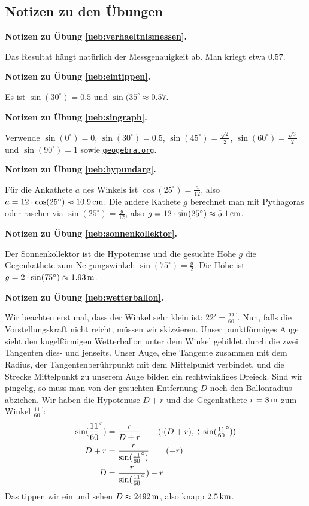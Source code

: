 \documentclass[%
11pt,%
twoside,%
titlepage,%
german,%
headsepline%
]{scrartcl}
\newcommand{\geogebralink}{\href{https://www.geogebra.org/calculator}{\texttt{geogebra.org}}}
\newcommand{\concatueb}[1]{ueb:#1}%
\newcommand{\concatlsg}[1]{lsg:#1}%
\newenvironment{lsg}[1]{%
    \par\noindent\textbf{Notizen zu Übung \ref{\concatueb{#1}}.}%
    \label{\concatlsg{#1}}
}{%
    \par%
}
\begin{document}
\clearpage

\subsection{Notizen zu den \"Ubungen}

\begin{lsg}{verhaeltnismessen}
Das Resultat h\"angt nat\"urlich der Messgenauigkeit ab. Man kriegt etwa $0.57$.
\end{lsg}

\begin{lsg}{eintippen}
Es ist $\sin(30^\circ)=0.5$ und $\sin(35^{\circ}\approx0.57$.
\end{lsg}

\begin{lsg}{singraph}
Verwende $\sin(0^{\circ})=0$, $\sin(30^{\circ})=0.5$, $\sin(45^{\circ})=\frac{\sqrt{2}}{2}$,  $\sin(60^{\circ})=\frac{\sqrt{3}}{2}$ und  $\sin(90^{\circ})=1$ sowie \geogebralink .
\end{lsg}

\begin{lsg}{hypundarg}
F\"ur die Ankathete $a$ des Winkels ist $\cos(25^\circ)=\frac{a}{12}$, also $a=12\cdot\cos(25^\circ)\approx\unit[10.9]{cm}$. Die andere Kathete $g$ berechnet man mit Pythagoras oder rascher via $\sin(25^\circ)=\frac{g}{12}$, also $g=12\cdot\sin(25^\circ)\approx\unit[5.1]{cm}$.
\end{lsg}

\begin{lsg}{sonnenkollektor}
Der Sonnenkollektor ist die Hypotenuse und die gesuchte H\"ohe $g$ die Gegenkathete zum Neigungswinkel: $\sin(75^{\circ})=\frac{g}{2}$. Die H\"ohe ist $g=2\cdot\sin(75^{\circ})\approx\unit[1.93]{m}$.
\end{lsg}

\begin{lsg}{wetterballon}
Wir beachten erst mal, dass der Winkel sehr klein ist: $22'=\frac{22}{60}^{\circ}$. Nun, falls die Vorstellungskraft nicht reicht, m\"ussen wir skizzieren. Unser punktf\"ormiges Auge sieht den kugelf\"ormigen Wetterballon unter dem Winkel gebildet durch die zwei Tangenten dies- und jenseits. Unser Auge, eine Tangente zusammen mit dem Radius, der Tangentenber\"uhrpunkt mit dem Mittelpunkt verbindet, und die Strecke Mittelpunkt zu unserem Auge bilden ein rechtwinkliges Dreieck. Sind wir pingelig, so muss man von der gesuchten Entfernung $D$ noch den Ballonradius abziehen. Wir haben die Hypotenuse $D+r$ und die Gegenkathete $r=\unit[8]{m}$ zum Winkel $\frac{11}{60}^{\circ}$:
\begin{align*}
\sin(\frac{11}{60}^{\circ}) &= \frac{r}{D+r}\tag{$\cdot(D+r), \div\sin(\frac{11}{60}^{\circ})$}\\
D+r &= \frac{r}{\sin(\frac{11}{60}^{\circ})}\tag{$-r$}\\
D &= \frac{r}{\sin(\frac{11}{60}^{\circ}})-r
\end{align*}
Das tippen wir ein und sehen $D\approx\unit[2492]{m}$, also knapp $\unit[2.5]{km}$.
\end{lsg}
\end{document}
